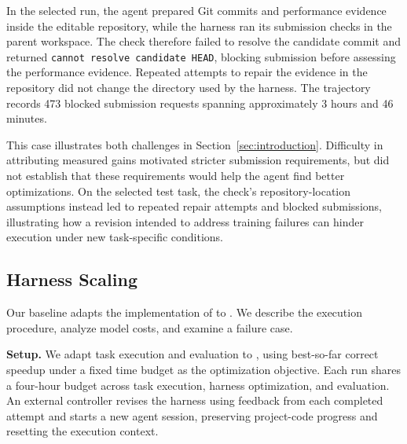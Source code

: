 In the selected run, the agent prepared Git commits and performance evidence inside the editable repository, while the harness ran its submission checks in the parent workspace. The check therefore failed to resolve the candidate commit and returned \texttt{cannot resolve candidate HEAD}, blocking submission before assessing the performance evidence. Repeated attempts to repair the evidence in the repository did not change the directory used by the harness. The trajectory records 473 blocked submission requests spanning approximately 3 hours and 46 minutes.

This case illustrates both challenges in Section~\ref{sec:introduction}. Difficulty in attributing measured gains motivated stricter submission requirements, but did not establish that these requirements would help the agent find better optimizations. On the selected test task, the check's repository-location assumptions instead led to repeated repair attempts and blocked submissions, illustrating how a revision intended to address training failures can hinder execution under new task-specific conditions.

\subsection{Harness Scaling}
\label{app:experiments-hs}

Our \hs{} baseline adapts the implementation of \citet{wang2026harnessevolution} to \perfrace{}. We describe the execution procedure, analyze model costs, and examine a failure case.

\textbf{Setup.} We adapt task execution and evaluation to \perfrace{}, using best-so-far correct speedup under a fixed time budget as the optimization objective. Each run shares a four-hour budget across task execution, harness optimization, and evaluation. An external controller revises the harness using feedback from each completed attempt and starts a new agent session, preserving project-code progress and resetting the execution context.

